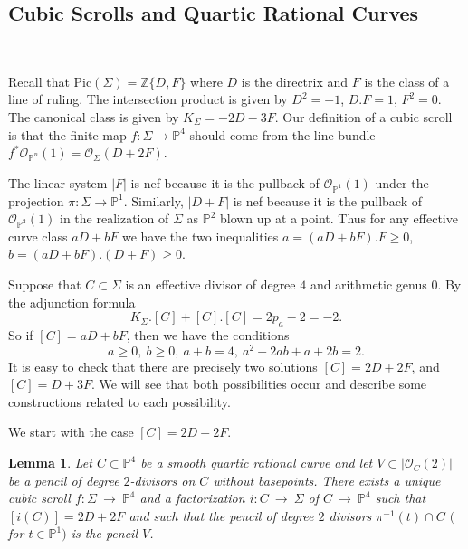 \documentclass[twoside,12pt,reqno]{amsart}
\theoremstyle{plain}
\newtheorem{lem}[thm]{Lemma}
\theoremstyle{definition}
\newcommand{\ZZ}{\mathbb{Z}}
\newcommand{\PP}{\mathbb{P}}
\def\ps{\vspace{4pt}}
\newcommand{\OO}{\mathcal O}
\begin{document}
\ps

\subsection{Cubic Scrolls and Quartic Rational
Curves}~\label{subsec-scr40}

\ps

Recall that $\text{Pic}(\Sigma) = \ZZ\{D,F\}$ where $D$ is the
directrix and $F$ is the class of a line of ruling.  The intersection
product is given by $D^2 = -1$, $D.F = 1$, $F^2 =0$.  The canonical
class is given by $K_\Sigma = -2D-3F$.  Our definition of a cubic scroll
is that the finite map $f:\Sigma\rightarrow \PP^4$ should come from the line
bundle $f^{*}\OO_{\PP^n}(1)=\OO_{\Sigma}(D+2F)$. 

\ps

The linear system $|F|$ is nef because it is the
pullback of $\OO_{\PP^1}(1)$ under the projection
$\pi:\Sigma\rightarrow \PP^1$.  Similarly, $|D+F|$ is nef because 
it is the pullback of $\OO_{\PP^2}(1)$ in the
realization of $\Sigma$ as $\PP^2$ blown up at a point.
Thus for any effective curve class $aD+bF$ we have
the two inequalities $a=(aD+bF).F \geq 0$, $b=(aD+bF).(D+F) \geq 0$.  

\ps

Suppose that $C\subset \Sigma$ is an effective
divisor of degree $4$ and arithmetic genus $0$.  By the adjunction
formula 
\begin{equation}
K_\Sigma.[C] + [C].[C] = 2p_a - 2 = -2.
\end{equation}
So if $[C]=aD+bF$, then we have the conditions
\begin{equation}
a\geq 0,\ b\geq 0,\ a+b = 4,\ a^2 -2ab +a+2b = 2.
\end{equation}
It is easy to check that there are precisely two solutions $[C]=2D+2F$, and
$[C]=D+3F$.  We will see that both possibilities occur and describe
some constructions related to each possibility.

\ps

We start with the case $[C] = 2D + 2F$.

\ps

\begin{lem}\label{lem-g1240}  Let $C\subset \PP^4$ be a smooth quartic 
rational curve and let $V\subset |\OO_C(2)|$ be a pencil of degree
$2$-divisors on $C$ without basepoints.  There exists a unique cubic scroll
$f:\Sigma~\rightarrow~ \PP^4$ 
and a factorization $i:C~\rightarrow~ \Sigma$ of $C~\rightarrow~ \PP^4$
such that $[i(C)] = 2D+2F$ and such that the pencil of degree $2$ divisors
$\pi^{-1}(t)\cap C$ $($for $t\in\PP^1)$ is the pencil $V$. 
\end{lem}
\end{document}
